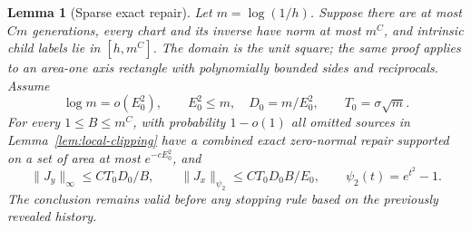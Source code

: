 \documentclass[11pt]{article}
\newtheorem{lemma}[theorem]{Lemma}
\numberwithin{equation}{section}
\begin{document}
\begin{lemma}[Sparse exact repair]\label{lem:local-sparse-repair}
Let $m=\log(1/h)$. Suppose there are at most $Cm$ generations, every
chart and its inverse have norm at most $m^C$, and intrinsic child labels
lie in $[h,m^C]$. The domain is the unit square; the same proof applies
to an area-one axis rectangle with polynomially bounded sides and
reciprocals. Assume
\[
 \log m=o(E_0^2),\qquad E_0^2\le m,
 \quad D_0=m/E_0^2,\qquad T_0=\sigma\sqrt m.
\]
For every $1\le B\le m^C$, with probability $1-o(1)$ all omitted
sources in Lemma~\ref{lem:local-clipping} have a combined exact
zero-normal repair supported on a set of area at most $e^{-cE_0^2}$,
and
\[
 \|J_y\|_\infty\le CT_0D_0/B,
 \qquad \|J_x\|_{\psi_2}\le CT_0D_0B/E_0,
 \qquad \psi_2(t)=e^{t^2}-1.
\]
The conclusion remains valid before any stopping rule based on the
previously revealed history.
\end{lemma}
\end{document}
